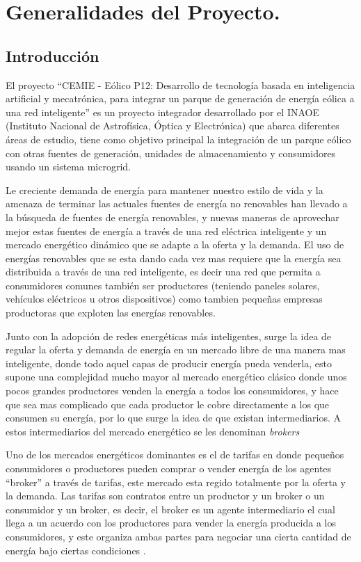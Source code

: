 \chapter{Generalidades del Proyecto.}
\newpage
\section*{Introducción}
El proyecto ``CEMIE - Eólico P12: Desarrollo de tecnología basada en inteligencia artificial y mecatrónica, para integrar un parque de generación de energía eólica a una red inteligente'' es un proyecto integrador desarrollado por el INAOE (Instituto Nacional de Astrofísica, Óptica y Electrónica) que abarca diferentes áreas de estudio, tiene como objetivo principal la integración de un parque eólico con otras fuentes de generación, unidades de almacenamiento y consumidores usando un
sistema microgrid.

Le creciente demanda de energía para mantener nuestro estilo de vida y la amenaza de terminar las actuales fuentes de energía no renovables han llevado a la búsqueda de fuentes de energía renovables, y nuevas maneras de aprovechar mejor estas fuentes de energía a través de una red eléctrica inteligente y un mercado energético dinámico que se adapte a la oferta y la demanda.
El uso de energías renovables que se esta dando cada vez mas requiere que la energía sea distribuida a través de una red inteligente, es decir una red que permita a consumidores comunes también ser productores (teniendo paneles solares, vehículos eléctricos u otros dispositivos) como tambien pequeñas empresas productoras que exploten las energías renovables.

Junto con la adopción de redes energéticas más inteligentes, surge la idea de regular la oferta y demanda de energía en un mercado libre de una manera mas inteligente, donde todo aquel capas de producir energía pueda venderla, esto supone una complejidad mucho mayor al mercado energético clásico donde unos pocos grandes productores venden la energía a todos los consumidores, y hace que sea mas complicado que cada productor le cobre directamente a los que consumen su energía, por lo que surge la idea de que existan intermediarios. A estos intermediarios del mercado energético se les denominan \textit{brokers}

Uno de los mercados energéticos dominantes es el de tarifas en donde pequeños consumidores o productores pueden comprar o vender energía de los agentes ``broker'' a través de tarifas, este mercado esta regido totalmente por la oferta y la demanda.
Las tarifas son contratos entre un productor y un broker o un consumidor y un broker, es decir, el broker es un agente intermediario el cual llega a un acuerdo con los productores para vender la energía producida a los consumidores, y este organiza ambas partes para negociar una cierta cantidad de energía bajo ciertas condiciones \cite{MPAlonsoAYRGonzalezDesarrolloDeTec}.

